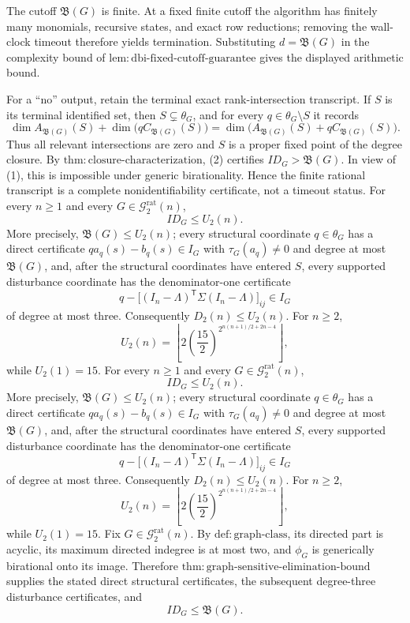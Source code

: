 The cutoff \(\mathfrak B(G)\) is finite.  At a fixed finite cutoff the algorithm has finitely many monomials, recursive states, and exact row reductions; removing the wall-clock timeout therefore yields termination.  Substituting \(d=\mathfrak B(G)\) in the complexity bound of \(\mathrm{lem:dbi\mbox{-}fixed\mbox{-}cutoff\mbox{-}guarantee}\) gives the displayed arithmetic bound.

For a ``no'' output, retain the terminal exact rank-intersection transcript.  If \(S\) is its terminal identified set, then \(S\subsetneq\theta_G\), and for every \(q\in\theta_G\setminus S\) it records
\[
 \dim A_{\mathfrak B(G)}(S)
 +\dim\bigl(qC_{\mathfrak B(G)}(S)\bigr)
 =\dim\bigl(A_{\mathfrak B(G)}(S)+qC_{\mathfrak B(G)}(S)\bigr).
 \tag{2}
\]
Thus all relevant intersections are zero and \(S\) is a proper fixed point of the degree closure.  By \(\mathrm{thm:closure\mbox{-}characterization}\), (2) certifies \(ID_G>\mathfrak B(G)\).  In view of (1), this is impossible under generic birationality.  Hence the finite rational transcript is a complete nonidentifiability certificate, not a timeout status.
For every \(n\geq1\) and every \(G\in\mathcal G_{2}^{\mathrm{rat}}(n)\),
\[
 ID_G\leq U_2(n).
\]
More precisely, \(\mathfrak B(G)\leq U_2(n)\); every structural coordinate \(q\in\theta_G\) has a direct certificate \(q a_q(s)-b_q(s)\in I_G\) with \(\tau_G(a_q)\neq0\) and degree at most \(\mathfrak B(G)\), and, after the structural coordinates have entered \(S\), every supported disturbance coordinate has the denominator-one certificate
\[
 q-\bigl[(I_n-\Lambda)^{\mathsf T}\Sigma(I_n-\Lambda)\bigr]_{ij}\in I_G
\]
of degree at most three.  Consequently \(D_2(n)\leq U_2(n)\).  For \(n\geq2\),
\[
 U_2(n)=
 \left\lfloor
 2\left(\frac{15}{2}\right)^{2^{n(n+1)/2+2n-4}}
 \right\rfloor,
\]
while \(U_2(1)=15\).
For every \(n\geq1\) and every \(G\in\mathcal G_{2}^{\mathrm{rat}}(n)\),
\[
 ID_G\leq U_2(n).
\]
More precisely, \(\mathfrak B(G)\leq U_2(n)\); every structural coordinate \(q\in\theta_G\) has a direct certificate \(q a_q(s)-b_q(s)\in I_G\) with \(\tau_G(a_q)\neq0\) and degree at most \(\mathfrak B(G)\), and, after the structural coordinates have entered \(S\), every supported disturbance coordinate has the denominator-one certificate
\[
 q-\bigl[(I_n-\Lambda)^{\mathsf T}\Sigma(I_n-\Lambda)\bigr]_{ij}\in I_G
\]
of degree at most three.  Consequently \(D_2(n)\leq U_2(n)\).  For \(n\geq2\),
\[
 U_2(n)=
 \left\lfloor
 2\left(\frac{15}{2}\right)^{2^{n(n+1)/2+2n-4}}
 \right\rfloor,
\]
while \(U_2(1)=15\).
Fix \(G\in\mathcal G_{2}^{\mathrm{rat}}(n)\).  By \(\mathrm{def:graph\mbox{-}class}\), its directed part is acyclic, its maximum directed indegree is at most two, and \(\phi_G\) is generically birational onto its image.  Therefore \(\mathrm{thm:graph\mbox{-}sensitive\mbox{-}elimination\mbox{-}bound}\) supplies the stated direct structural certificates, the subsequent degree-three disturbance certificates, and
\[
 ID_G\leq\mathfrak B(G).
 \tag{1}
\]

